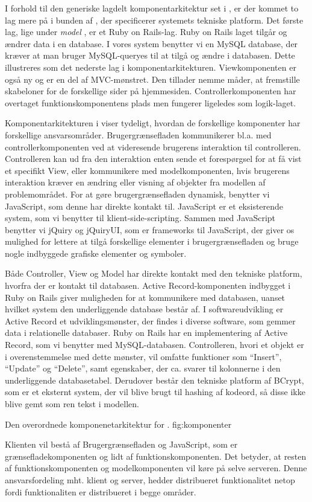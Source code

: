 I forhold til den generiske lagdelt komponentarkitektur set i , er der kommet to lag mere på i bunden af , der specificerer systemets tekniske platform. Det første lag, lige under \textit{model} , er et Ruby on Rails-lag. Ruby on Rails laget tilgår og ændrer data i en database. I vores system benytter vi en MySQL database, der kræver at man bruger MySQL-queryes til at tilgå og ændre i databasen. Dette illustreres som det nederste lag i komponentarkitekturen. Viewkomponenten er også ny og er en del af MVC-mønstret. Den tillader nemme måder, at fremstille skabeloner for de forskellige sider på hjemmesiden. Controllerkomponenten har overtaget funktionskomponentens plads men fungerer ligeledes som logik-laget.

Komponentarkitekturen i  viser tydeligt, hvordan de forskellige komponenter har forskellige ansvarsområder. Brugergrænsefladen kommunikerer bl.a. med controllerkomponenten ved at videresende brugerens interaktion til controlleren. Controlleren kan ud fra den interaktion enten sende et forespørgsel for at få vist et specifikt View, eller kommunikere med modelkomponenten, hvis brugerens interaktion kræver en ændring eller visning af objekter fra modellen af problemområdet. For at gøre brugergrænsefladen dynamisk, benytter vi JavaScript, som denne har direkte kontakt til. JavaScript er et eksisterende system, som vi benytter til klient-side-scripting. Sammen med JavaScript benytter vi jQuiry og jQuiryUI, som er frameworks til JavaScript, der giver os mulighed for lettere at tilgå forskellige elementer i brugergrænsefladen og bruge nogle indbyggede grafiske elementer og symboler.


Både Controller, View og Model har direkte kontakt med den tekniske platform, hvorfra der er kontakt til databasen. Active Record-komponenten indbygget i Ruby on Rails giver muligheden for at kommunikere med databasen, uanset hvilket system den underliggende database består af. I softwareudvikling er Active Record et udviklingsmønster, der findes i diverse software, som gemmer data i relationelle databaser. Ruby on Rails har en implementering af Active Record, som vi benytter med MySQL-databasen. Controlleren, hvori et objekt er i overenstemmelse med dette mønster, vil omfatte funktioner som ``Insert'', ``Update'' og ``Delete'', samt egenskaber, der ca. svarer til kolonnerne i den underliggende databasetabel.\cite{activerecordwiki} Derudover består den tekniske platform af BCrypt, som er et eksternt system, der vil blive brugt til hashing af kodeord, så disse ikke blive gemt som ren tekst i modellen.


	{Den overordnede komponenetarkitektur for \Foodl{}.}
	{fig:komponenter}


Klienten vil bestå af Brugergrænsefladen og JavaScript, som er grænsefladekomponenten og lidt af funktionskomponenten. Det betyder, at resten af funktionskomponenten og modelkomponenten vil køre på selve serveren. Denne ansvarsfordeling mht. klient og server, hedder distribueret funktionalitet netop fordi funktionaliten er distribueret i begge områder.
